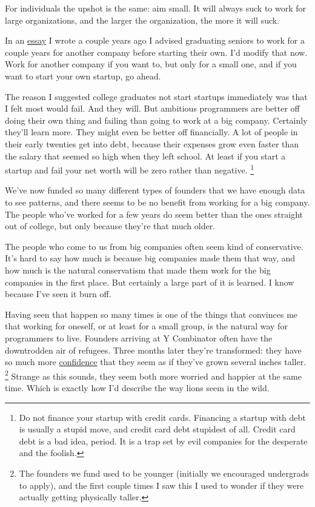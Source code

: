 \documentclass[12pt]{book}
\begin{document}
For individuals the upshot is the same: aim small. It will always suck
to work for large organizations, and the larger the organization, the
more it will suck.

In an \href{start.html}{essay} I wrote a couple years ago I advised
graduating seniors to work for a couple years for another company before
starting their own. I'd modify that now. Work for another company if you
want to, but only for a small one, and if you want to start your own
startup, go ahead.

The reason I suggested college graduates not start startups immediately
was that I felt most would fail. And they will. But ambitious
programmers are better off doing their own thing and failing than going
to work at a big company. Certainly they'll learn more. They might even
be better off financially. A lot of people in their early twenties get
into debt, because their expenses grow even faster than the salary that
seemed so high when they left school. At least if you start a startup
and fail your net worth will be zero rather than negative.
\footnote{Do not finance your startup with credit cards. Financing a
startup with debt is usually a stupid move, and credit card debt
stupidest of all. Credit card debt is a bad idea, period. It is a trap
set by evil companies for the desperate and the foolish.}

We've now funded so many different types of founders that we have enough
data to see patterns, and there seems to be no benefit from working for
a big company. The people who've worked for a few years do seem better
than the ones straight out of college, but only because they're that
much older.

The people who come to us from big companies often seem kind of
conservative. It's hard to say how much is because big companies made
them that way, and how much is the natural conservatism that made them
work for the big companies in the first place. But certainly a large
part of it is learned. I know because I've seen it burn off.

Having seen that happen so many times is one of the things that
convinces me that working for oneself, or at least for a small group, is
the natural way for programmers to live. Founders arriving at Y
Combinator often have the downtrodden air of refugees. Three months
later they're transformed: they have so much more
\href{http://paulmckellar.com/photos/03l}{confidence} that they seem as
if they've grown several inches taller. \footnote{The founders we fund used to be younger (initially we encouraged
undergrads to apply), and the first couple times I saw this I used to
wonder if they were actually getting physically taller.} Strange
as this sounds, they seem both more worried and happier at the same
time. Which is exactly how I'd describe the way lions seem in the wild.
\end{document}
